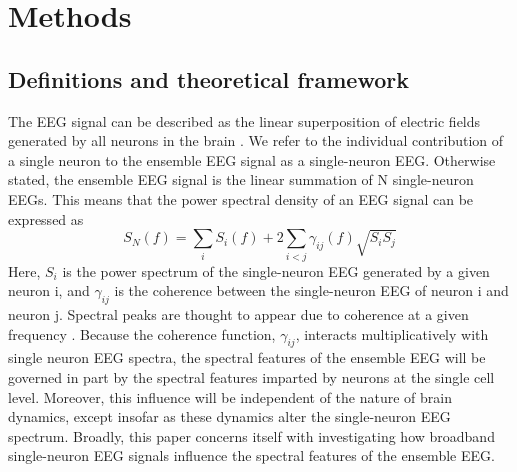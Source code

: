 \section{Methods}
\subsection{Definitions and theoretical framework}
The EEG signal can be described as the linear superposition of electric fields generated by all neurons in the brain \cite{Nunez2006,Malmivuo1995}. We refer to the individual contribution of a single neuron to the ensemble EEG signal as a single-neuron EEG. Otherwise stated, the ensemble EEG signal is the linear summation of N single-neuron EEGs. This means that the power spectral density of an EEG signal can be expressed as
\begin{equation} \label{eq:superposition}
S_N(f)=\sum_{i}{S_i(f)}+2\sum_{i<j}{\gamma_{ij}\left(f\right)\sqrt{S_i S_j}}
\end{equation}
Here, $S_i$ is the power spectrum of the single-neuron EEG generated by a given neuron i, and $\gamma_{ij}$ is the coherence between the single-neuron EEG of neuron i and neuron j. Spectral peaks are thought to appear due to coherence at a given frequency \cite{Nunez2006}. Because the coherence function, $\gamma_{ij}$, interacts multiplicatively with single neuron EEG spectra, the spectral features of the ensemble EEG will be governed in part by the spectral features imparted by neurons at the single cell level. Moreover, this influence will be independent of the nature of brain dynamics, except insofar as these dynamics alter the single-neuron EEG spectrum. Broadly, this paper concerns itself with investigating how broadband single-neuron EEG signals influence the spectral features of the ensemble EEG. 

